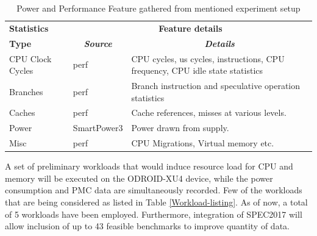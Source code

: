 \documentclass[conference]{IEEEtran}
\begin{document}
        \begin{table}[htbp]
            \caption{Power and Performance Feature gathered from mentioned experiment setup}
            \begin{center}
                \begin{tabular}{|p{1.8cm}|p{2cm}|p{3.6cm}|}
                    \hline
                    \textbf{Statistics}&\multicolumn{2}{|c|}{\textbf{Feature details}} \\
                    \cline{2-3} 
                    \textbf{Type} & \multicolumn{1}{|c|}{\textbf{\textit{Source}}} & \multicolumn{1}{|c|}{\textbf{\textit{Details}}} \\
                    \hline
                    CPU Clock Cycles  & perf\cite{2015137}  & CPU cycles, us cycles, instructions, CPU frequency, CPU idle state statistics \\
                    \hline
                    Branches  & perf & Branch instruction and speculative operation statistics \\
                    \hline
                    Caches   & perf  &  Cache references, misses at various levels. \\
                    \hline
                    Power & SmartPower3\cite{odroid-smartpower3} &  Power drawn from supply. \\
                    \hline
                    Misc & perf  & CPU Migrations, Virtual memory etc. \\
                    \hline
                \end{tabular}
                \label{Power-Perf-data-gathered}
            \end{center}
        \end{table}

        \par A set of preliminary workloads that would induce resource load for CPU and memory will be executed on the ODROID-XU4 device, while the power consumption and PMC data are simultaneously recorded. Few of the workloads that are being considered as listed in Table \ref{Workload-listing}. As of now, a total of 5 workloads have been employed. Furthermore, integration of SPEC2017 will allow inclusion of up to 43 feasible benchmarks to improve quantity of data.
\end{document}
